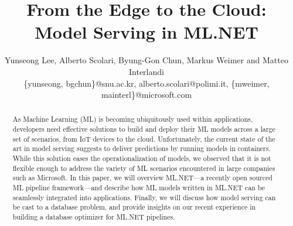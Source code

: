 \documentclass[11pt]{article}
\newcommand{\eat}[1]{}
\newcommand{\pretzel}{\textsc{Pretzel}\xspace}
\newcommand{\mlnet}{ML.NET\xspace}
\begin{document}
\title{From the Edge to the Cloud: Model Serving in ML.NET}
\author{Yunseong Lee, Alberto Scolari, Byung-Gon Chun, Markus Weimer and Matteo Interlandi\\
{\small \{yunseong, bgchun\}@snu.ac.kr, alberto.scolari@polimi.it, \{mweimer, mainterl\}@microsoft.com}}
\maketitle

\begin{abstract}
As Machine Learning (ML) is becoming ubiquitously used within applications, developers need effective solutions to build and deploy their ML models across a large set of scenarios, from IoT devices to the cloud.
Unfortunately, the current state of the art in model serving suggests to deliver predictions by running models in containers.
While this solution eases the operationalization of models, we observed that it is not flexible enough to address the variety of ML scenarios encountered in large companies such as Microsoft.  
In this paper, we will overview ML.NET---a recently open sourced ML pipeline framework---and describe how ML models written in ML.NET can be seamlessly integrated into applications.
Finally, we will discuss how model serving can be cast to a database problem, and provide insights on our recent experience in building a database optimizer for ML.NET pipelines. 


\eat{
provide this flexibility and ease, they still lack the ability to optimize the model for the inference phase, which has different characteristics and requirements from the training phase in which the model was built. This is due to those solutions ignoring the actual sequence of operations along the pipeline, treating it only as a black-box. Here, we show the main limitations of this approach and advocate for a white-box approach, where the model structure and state are used to optimize the model itself and manage its resources. Out of these ideas, we built a prototype framework supporting \mlnet models called \pretzel, which shows noticeable improvements in performance and resources usage.}
\end{abstract}
\end{document}
